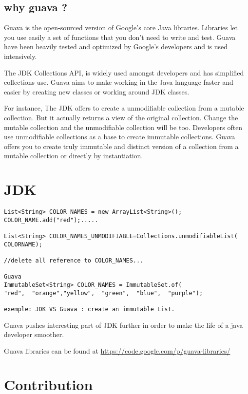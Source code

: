 \documentclass[paper=a4, fontsize=11pt]{scrartcl}
\numberwithin{equation}{section}%
\numberwithin{figure}{section}%
\numberwithin{table}{section}%
\begin{document}
\subsection{why guava ?}

Guava is the open-sourced version of Google's core Java libraries.
Libraries let you use easily a set of functions that you don't need to
write and test. 
Guava have been heavily tested and optimized by Google's developers
and is used intensively.

The JDK Collections API, is widely used amongst developers and has
simplified collections use. 
Guava aims to make working in the Java language faster and easier by
creating new classes or working around JDK classes.

For instance, The JDK offers to create a unmodifiable collection from
a mutable collection. But it actually returns a view of the original
collection. Change the mutable collection and the unmodifiable
collection will be too. Developers often use unmodifiable collections
as a base to create immutable collections. Guava offers you to create
truly immutable and distinct version of a collection from a mutable
collection or directly by instantiation.

\newpage
\section{JDK}

\begin{verbatim}
List<String> COLOR_NAMES = new ArrayList<String>();
COLOR_NAME.add("red");.....

List<String> COLOR_NAMES_UNMODIFIABLE=Collections.unmodifiableList(
COLORNAME);

//delete all reference to COLOR_NAMES...

Guava
ImmutableSet<String> COLOR_NAMES = ImmutableSet.of(  
"red",  "orange","yellow",  "green",  "blue",  "purple");

exemple: JDK VS Guava : create an immutable List.
\end{verbatim}

Guava pushes interesting part of JDK further in order to make the life
of a java developer smoother.

Guava libraries can be found at \url{https://code.google.com/p/guava-libraries/}

\section{Contribution}
\end{document}
